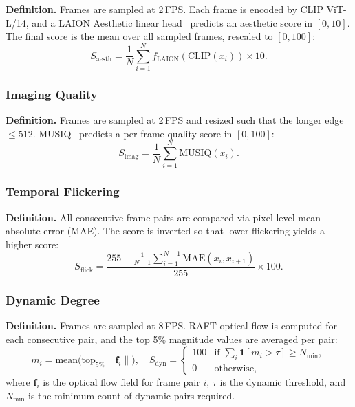 \documentclass{llmxive}
\providecommand{\myparagraph}[1]{\vspace{-0.1em}\noindent\textbf{#1}\hspace{0.3em}}
\begin{document}
\myparagraph{Definition.}
Frames are sampled at 2\,FPS. Each frame is encoded by CLIP ViT-L/14, and a LAION Aesthetic linear head~\cite{schuhmann2022laion5b} predicts an aesthetic score in $[0, 10]$. The final score is the mean over all sampled frames, rescaled to $[0, 100]$:
\begin{equation}
  S_{\text{aesth}} = \frac{1}{N}\sum_{i=1}^{N} f_{\text{LAION}}(\text{CLIP}(x_i)) \times 10.
\end{equation}

\subsubsection{Imaging Quality}
\label{app:imaging_detail}

\myparagraph{Definition.}
Frames are sampled at 2\,FPS and resized such that the longer edge $\leq 512$. MUSIQ~\cite{ke2021musiq} predicts a per-frame quality score in $[0, 100]$:
\begin{equation}
  S_{\text{imag}} = \frac{1}{N}\sum_{i=1}^{N} \text{MUSIQ}(x_i).
\end{equation}

\subsubsection{Temporal Flickering}
\label{app:flickering_detail}

\myparagraph{Definition.}
All consecutive frame pairs are compared via pixel-level mean absolute error (MAE). The score is inverted so that lower flickering yields a higher score:
\begin{equation}
  S_{\text{flick}} = \frac{255 - \frac{1}{N-1}\sum_{i=1}^{N-1}\text{MAE}(x_i, x_{i+1})}{255} \times 100.
\end{equation}

\subsubsection{Dynamic Degree}
\label{app:dynamic_detail}

\myparagraph{Definition.}
Frames are sampled at 8\,FPS. RAFT optical flow is computed for each consecutive pair, and the top 5\% magnitude values are averaged per pair:
\begin{equation}
  m_i = \mathrm{mean}\!\bigl(\mathrm{top}_{5\%}\lVert \mathbf{f}_i \rVert\bigr), \quad
  S_{\mathrm{dyn}} =
  \begin{cases}
    100 & \text{if } \sum_{i} \mathbf{1}[m_i > \tau] \geq N_{\min}, \\
    0   & \text{otherwise},
  \end{cases}
\end{equation}
where $\mathbf{f}_i$ is the optical flow field for frame pair $i$, $\tau$ is the dynamic threshold, and $N_{\min}$ is the minimum count of dynamic pairs required.
\end{document}
